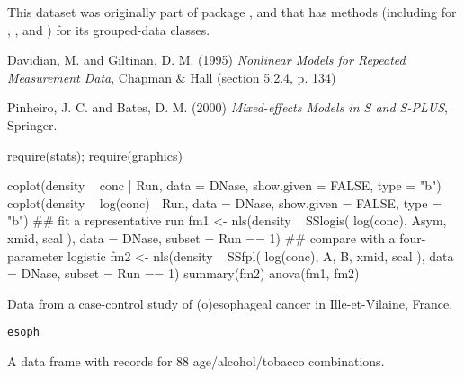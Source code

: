 %
\begin{Details}\relax
This dataset was originally part of package , and that has
methods (including for \code{[}, ,  and
) for its grouped-data classes. 
\end{Details}
%
\begin{Source}\relax
Davidian, M. and Giltinan, D. M. (1995) \emph{Nonlinear Models for
Repeated Measurement Data}, Chapman \& Hall (section 5.2.4, p. 134)

Pinheiro, J. C. and Bates, D. M. (2000) \emph{Mixed-effects Models in
S and S-PLUS}, Springer.
\end{Source}
%
\begin{Examples}
\begin{ExampleCode}
require(stats); require(graphics)

coplot(density ~ conc | Run, data = DNase,
       show.given = FALSE, type = "b")
coplot(density ~ log(conc) | Run, data = DNase,
       show.given = FALSE, type = "b")
## fit a representative run
fm1 <- nls(density ~ SSlogis( log(conc), Asym, xmid, scal ),
    data = DNase, subset = Run == 1)
## compare with a four-parameter logistic
fm2 <- nls(density ~ SSfpl( log(conc), A, B, xmid, scal ),
    data = DNase, subset = Run == 1)
summary(fm2)
anova(fm1, fm2)
\end{ExampleCode}
\end{Examples}
%
\begin{Description}\relax
Data from a case-control study of (o)esophageal cancer in
Ille-et-Vilaine, France.
\end{Description}
%
\begin{Usage}
\begin{verbatim}
esoph
\end{verbatim}
\end{Usage}
%
\begin{Format}
A data frame with records for 88 age/alcohol/tobacco combinations.


\end{Format}
